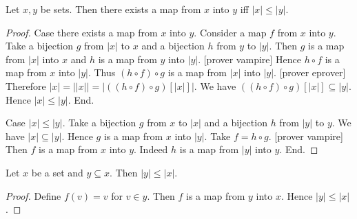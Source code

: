 \documentclass[../set-theory.tex]{subfiles}
\begin{document}
  \begin{forthel}
    \begin{proposition}
      Let $x, y$ be sets.
      Then there exists a map from $x$ into $y$ iff $|x| \leq |y|$.
    \end{proposition}
    \begin{proof}
      Case there exists a map from $x$ into $y$.
        Consider a map $f$ from $x$ into $y$.
        Take a bijection $g$ from $|x|$ to $x$ and a bijection $h$ from $y$ to
        $|y|$.
        Then $g$ is a map from $|x|$ into $x$ and $h$ is a map from $y$ into
        $|y|$.
        [prover vampire]
        Hence $h \circ f$ is a map from $x$ into $|y|$.
        Thus $(h \circ f) \circ g$ is a map from $|x|$ into $|y|$.
        [prover eprover]
        Therefore $|x|
          = ||x||
          = |((h \circ f) \circ g)[|x|]|$.
        We have $((h \circ f) \circ g)[|x|] \subseteq |y|$.
        Hence $|x| \leq |y|$.
      End.

      Case $|x| \leq |y|$.
        Take a bijection $g$ from $x$ to $|x|$ and a bijection $h$ from $|y|$ to
        $y$.
        We have $|x| \subseteq |y|$.
        Hence $g$ is a map from $x$ into $|y|$.
        Take $f = h \circ g$.
        [prover vampire]
        Then $f$ is a map from $x$ into $y$.
        Indeed $h$ is a map from $|y|$ into $y$.
      End.
    \end{proof}
  \end{forthel}

  \begin{forthel}
    \begin{corollary}
      Let $x$ be a set and $y \subseteq x$.
      Then $|y| \leq |x|$.
    \end{corollary}
    \begin{proof}
      Define $f(v) = v$ for $v \in y$.
      Then $f$ is a map from $y$ into $x$.
      Hence $|y| \leq |x|$.
    \end{proof}
  \end{forthel}
\end{document}
